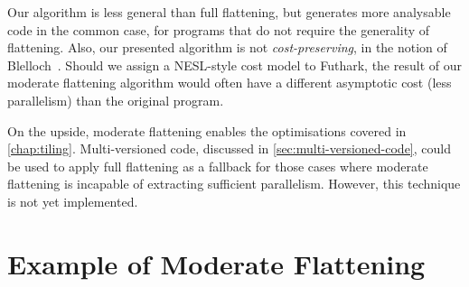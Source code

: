 Our algorithm is less general than full flattening, but generates more
analysable code in the common case, for programs that do not require
the generality of flattening.  Also, our presented algorithm is not
\textit{cost-preserving}, in the notion of
Blelloch~\cite{Blelloch:1996:PTS:232627.232650}.  Should we assign a
NESL-style cost model to Futhark, the result of our moderate
flattening algorithm would often have a different asymptotic cost
(less parallelism) than the original program.

On the upside, moderate flattening enables the optimisations covered
in \cref{chap:tiling}.  Multi-versioned code, discussed in
\cref{sec:multi-versioned-code}, could be used to apply full
flattening as a fallback for those cases where moderate flattening is
incapable of extracting sufficient parallelism.  However, this
technique is not yet implemented.

\section{Example of Moderate Flattening}
\label{sec:kernel-extraction}

